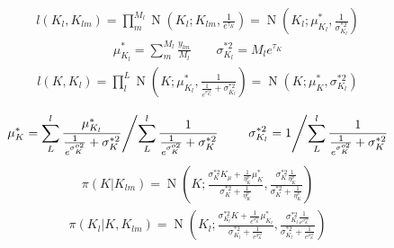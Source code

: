 \documentclass[11pt,a4paper]{article}
\begin{document}
\begin{align*}
l(K_l,K_{lm})=\prod_{m}^{M_{l}}\operatorname{N}(K_l;K_{lm},\frac{1}{e^{\tau_{K}}})=
\operatorname{N}(K_l;\mu^{*}_{K_l},\frac{1}{\sigma^{*2}_{K_l}})
\end{align*}
\begin{align*}
\mu^{*}_{K_l}=\sum_{m}^{M_{l}} \frac{y_{lm} }{ M_l}
\qquad 
{\sigma^{*2}_{K_l}}=M_{l}e^{\tau_{K}} 
\end{align*}
\begin{align*}
l(K,K_{l})=\prod_{l}^{L}\operatorname{N}(K;\mu^{*}_{K_l},\frac{1}{\frac{1}{e^{\sigma^{*2}_{K_l}}}+{\sigma^{*2}_{K_l}}})=
\operatorname{N}(K;\mu^{*}_{K},{\sigma^{*2}_{K_l}})
\end{align*}

\begin{align*}
\left.\mu^{*}_{K}=\sum_{L}^{l}\frac{\mu^{*}_{K_l}}{\frac{1}{e^{{\sigma^{o2}_{K}}}}+{\sigma^{*2}_{K}}} \middle/ \sum_{L}^{l}\frac{1}{\frac{1}{e^{{\sigma^{o2}_{K}}}}+{\sigma^{*2}_{K}}}  \right.
\qquad 
\left.{\sigma^{*2}_{K_{l}}}=1\middle/
\sum_{L}^{l}\frac{1}{\frac{1}{e^{{\sigma^{o2}_{K}}}}+{\sigma^{*2}_{K}}}\right.
\end{align*}
\begin{align*}
\pi(K|K_{lm})=\operatorname{N}(K;\frac{{\sigma^{*2}_{K}} K_{\mu}+\frac{1}{\eta^{p}_{K}}\mu^{*}_K}{{\sigma^{*2}_{K}}+\frac{1}{\eta^{p}_{K}}},\frac{{\sigma^{*2}_{K}} \frac{1}{\eta^{p}_{K}}}{{\sigma^{*2}_{K}}+\frac{1}{\eta^{p}_{K}}} )
\end{align*}
\begin{align*}
\pi(K_{l}|K,K_{lm})=\operatorname{N}(K_l;
\frac{
	{\sigma^{*2}_{K_{l}}} K + \frac{1}{ e^{ {\sigma^{o2}_{K}} } } \mu^{*}_{K_{l}}
	}{
	{\sigma^{*2}_{K_{l}}} + \frac{1}{ e^{ {\sigma^{o2}_{K}} } }
	}
,\frac{
	{\sigma^{*2}_{K_{l}}} \frac{1}{e^{{\sigma^{o2}_{K}}}}
	}{
	{\sigma^{*2}_{K_{l}}}+\frac{1}{e^{{\sigma^{o2}_{K}}}}} )
\end{align*}
\end{document}
